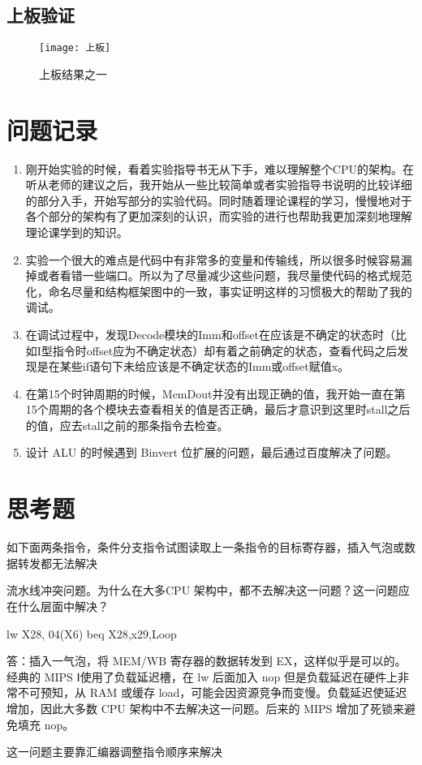 \documentclass{../source/Experiment}
\begin{document}
\subsection{上板验证}
\begin{figure}
    \centering
    \texttt{[image: 上板]}
    \caption{上板结果之一}
\end{figure}
\section{问题记录}
\begin{enumerate}
    \item 刚开始实验的时候，看着实验指导书无从下手，难以理解整个CPU的架构。在听从老师的建议之后，我开始从一些比较简单或者实验指导书说明的比较详细的部分入手，开始写部分的实验代码。同时随着理论课程的学习，慢慢地对于各个部分的架构有了更加深刻的认识，而实验的进行也帮助我更加深刻地理解理论课学到的知识。
    \item 实验一个很大的难点是代码中有非常多的变量和传输线，所以很多时候容易漏掉或者看错一些端口。所以为了尽量减少这些问题，我尽量使代码的格式规范化，命名尽量和结构框架图中的一致，事实证明这样的习惯极大的帮助了我的调试。
    \item 在调试过程中，发现Decode模块的Imm和offset在应该是不确定的状态时（比如I型指令时offset应为不确定状态）却有着之前确定的状态，查看代码之后发现是在某些if语句下未给应该是不确定状态的Imm或offset赋值x。
    \item 在第15个时钟周期的时候，MemDout并没有出现正确的值，我开始一直在第15个周期的各个模块去查看相关的值是否正确，最后才意识到这里时stall之后的值，应去stall之前的那条指令去检查。
    \item 设计 ALU 的时候遇到 Binvert 位扩展的问题，最后通过百度解决了问题。
\end{enumerate}

\section{思考题}
如下面两条指令，条件分支指令试图读取上一条指令的目标寄存器，插入气泡或数据转发都无法解决

流水线冲突问题。为什么在大多CPU 架构中，都不去解决这一问题？这一问题应在什么层面中解决？

lw X28, 04(X6)
beq X28,x29,Loop

答：插入一气泡，将 MEM/WB 寄存器的数据转发到 EX，这样似乎是可以的。经典的 MIPS Ⅰ使用了负载延迟槽，在 lw 后面加入 nop 但是负载延迟在硬件上非常不可预知，从 RAM 或缓存 load，可能会因资源竞争而变慢。负载延迟使延迟增加，因此大多数 CPU 架构中不去解决这一问题。后来的 MIPS 增加了死锁来避免填充 nop。

这一问题主要靠汇编器调整指令顺序来解决
\end{document}
